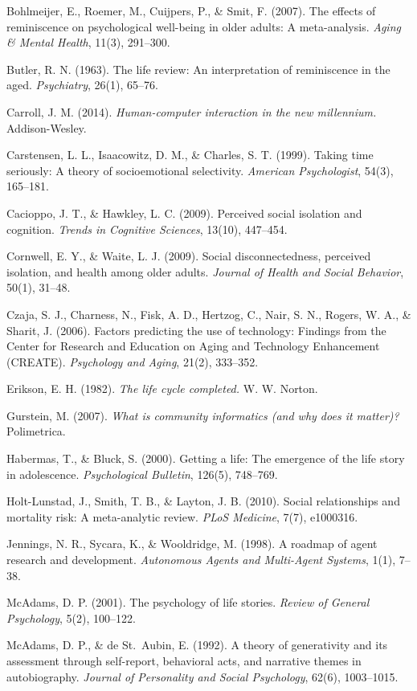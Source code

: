 \documentclass[
  journal,
]{IEEEtran}%
\begin{document}
Bohlmeijer, E., Roemer, M., Cuijpers, P., \& Smit, F. (2007). The
effects of reminiscence on psychological well-being in older adults: A
meta-analysis. \emph{Aging \& Mental Health}, 11(3), 291--300.

Butler, R. N. (1963). The life review: An interpretation of reminiscence
in the aged. \emph{Psychiatry}, 26(1), 65--76.

Carroll, J. M. (2014). \emph{Human-computer interaction in the new
millennium.} Addison-Wesley.

Carstensen, L. L., Isaacowitz, D. M., \& Charles, S. T. (1999). Taking
time seriously: A theory of socioemotional selectivity. \emph{American
Psychologist}, 54(3), 165--181.

Cacioppo, J. T., \& Hawkley, L. C. (2009). Perceived social isolation
and cognition. \emph{Trends in Cognitive Sciences}, 13(10), 447--454.

Cornwell, E. Y., \& Waite, L. J. (2009). Social disconnectedness,
perceived isolation, and health among older adults. \emph{Journal of
Health and Social Behavior}, 50(1), 31--48.

Czaja, S. J., Charness, N., Fisk, A. D., Hertzog, C., Nair, S. N.,
Rogers, W. A., \& Sharit, J. (2006). Factors predicting the use of
technology: Findings from the Center for Research and Education on Aging
and Technology Enhancement (CREATE). \emph{Psychology and Aging}, 21(2),
333--352.

Erikson, E. H. (1982). \emph{The life cycle completed.} W. W. Norton.

Gurstein, M. (2007). \emph{What is community informatics (and why does
it matter)?} Polimetrica.

Habermas, T., \& Bluck, S. (2000). Getting a life: The emergence of the
life story in adolescence. \emph{Psychological Bulletin}, 126(5),
748--769.

Holt-Lunstad, J., Smith, T. B., \& Layton, J. B. (2010). Social
relationships and mortality risk: A meta-analytic review. \emph{PLoS
Medicine}, 7(7), e1000316.

Jennings, N. R., Sycara, K., \& Wooldridge, M. (1998). A roadmap of
agent research and development. \emph{Autonomous Agents and Multi-Agent
Systems}, 1(1), 7--38.

McAdams, D. P. (2001). The psychology of life stories. \emph{Review of
General Psychology}, 5(2), 100--122.

McAdams, D. P., \& de St.~Aubin, E. (1992). A theory of generativity and
its assessment through self-report, behavioral acts, and narrative
themes in autobiography. \emph{Journal of Personality and Social
Psychology}, 62(6), 1003--1015.
\end{document}

